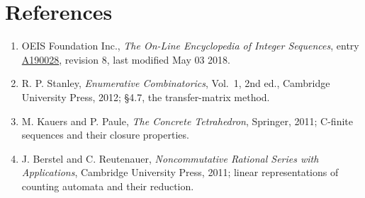 \documentclass[11pt]{article}
\theoremstyle{definition}
\begin{document}
\section{References}

\begin{enumerate}

\item OEIS Foundation Inc., \emph{The On-Line Encyclopedia of Integer Sequences}, entry \href{https://oeis.org/A190028}{A190028}, revision 8, last modified May 03 2018.

\item R. P. Stanley, \emph{Enumerative Combinatorics}, Vol.~1, 2nd ed., Cambridge University Press, 2012; \S4.7, the transfer-matrix method.

\item M. Kauers and P. Paule, \emph{The Concrete Tetrahedron}, Springer, 2011; C-finite sequences and their closure properties.

\item J. Berstel and C. Reutenauer, \emph{Noncommutative Rational Series with Applications}, Cambridge University Press, 2011; linear representations of counting automata and their reduction.

\end{enumerate}
\end{document}
